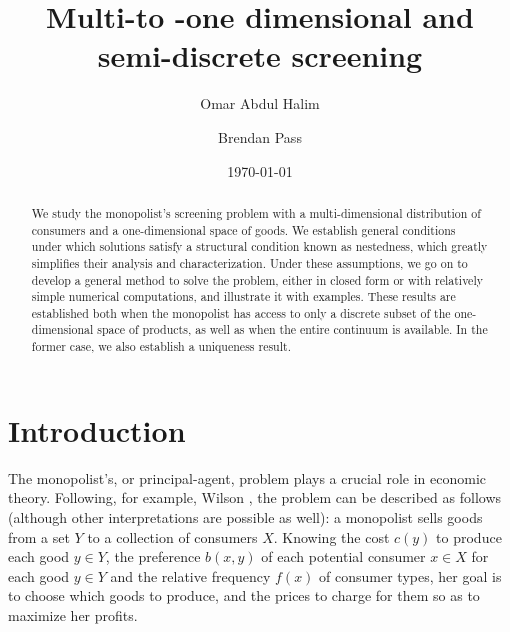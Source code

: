 \documentclass[12pt,reqno]{amsart}
\title{Multi-to -one dimensional and semi-discrete screening}
\date{\today}
\author{Omar {Abdul Halim}}
\author{Brendan Pass}
\begin{document}
\begin{abstract}
We study the monopolist's screening problem with a multi-dimensional distribution of consumers and a one-dimensional space of goods.  We establish general conditions under which solutions satisfy a structural condition known as nestedness, which greatly simplifies their analysis and characterization.  Under these assumptions, we go on to develop a general method to solve the problem, either in closed form or with relatively simple numerical computations, and illustrate it with examples.  These results are established both when the monopolist has access to only a discrete subset of the one-dimensional space of products, as well as when the entire continuum is available.  In the former case, we also establish a uniqueness result.
\end{abstract}
\maketitle
\section{Introduction}


The monopolist's, or principal-agent, problem plays a crucial role in economic theory.  Following, for example, Wilson \cite{Wilson93},
the problem can be described as follows (although other interpretations are possible as well): a monopolist sells goods from a set $Y$ to a collection of consumers $X$.  Knowing the cost $c(y)$ to produce each good $y \in Y$, the preference $b(x,y)$ of each potential consumer $x \in X$   for each good $y \in Y$ and the relative frequency $f(x)$ of consumer types, her goal is to choose which goods to produce, and the prices to charge for them %
so as to maximize her profits.
\end{document}
